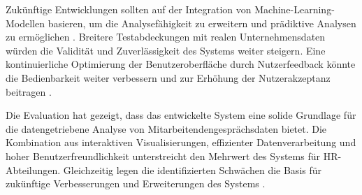 Zukünftige Entwicklungen sollten auf der Integration von Machine-Learning-Modellen basieren, um die Analysefähigkeit zu erweitern und prädiktive Analysen zu ermöglichen \cite{aral2012threeway}. Breitere Testabdeckungen mit realen Unternehmensdaten würden die Validität und Zuverlässigkeit des Systems weiter steigern. Eine kontinuierliche Optimierung der Benutzeroberfläche durch Nutzerfeedback könnte die Bedienbarkeit weiter verbessern und zur Erhöhung der Nutzerakzeptanz beitragen \cite{sedlmair2011information}.

Die Evaluation hat gezeigt, dass das entwickelte System eine solide Grundlage für die datengetriebene Analyse von Mitarbeitendengesprächsdaten bietet. Die Kombination aus interaktiven Visualisierungen, effizienter Datenverarbeitung und hoher Benutzerfreundlichkeit unterstreicht den Mehrwert des Systems für HR-Abteilungen. Gleichzeitig legen die identifizierten Schwächen die Basis für zukünftige Verbesserungen und Erweiterungen des Systems \cite{burnett2021future}.
